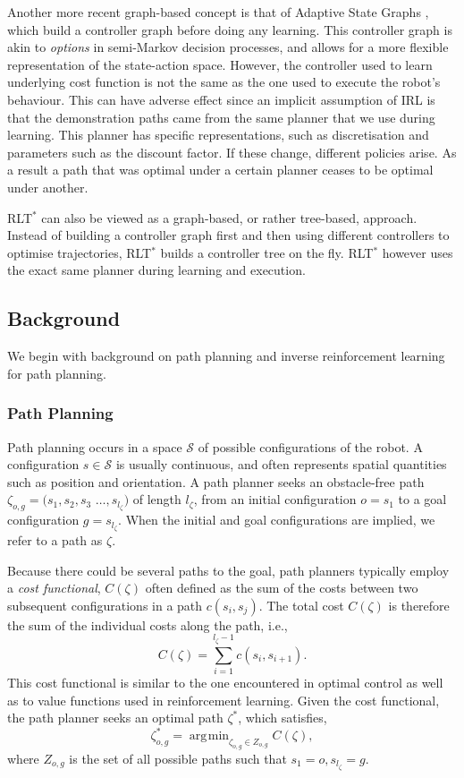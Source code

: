 \documentclass[a4paper,11pt]{report}
\DeclareMathOperator*{\argmin}{\arg\!\min}
\begin{document}
Another more recent graph-based concept is that of Adaptive State Graphs \cite{okallearning}, which build a controller graph before doing any learning. This controller graph is akin to \emph{options} in semi-Markov decision processes, and allows for a more flexible representation of the state-action space. However, the controller used to learn underlying cost function is not the same as the one used to execute the robot's behaviour. This can have adverse effect since an implicit assumption of IRL is that the demonstration paths came from the same planner that we use during learning. This planner has specific representations, such as discretisation and parameters such as the discount factor. If these change, different policies arise. As a result a path that was optimal under a certain planner ceases to be optimal under another.

RLT$^*$ can also be viewed as a graph-based, or rather tree-based, approach. Instead of building a controller graph first and then using different controllers to optimise trajectories, RLT$^*$ builds a controller tree on the fly. RLT$^*$ however uses the exact same planner during learning and execution.


\subsection{Background}
We begin with background on path planning and inverse reinforcement learning for path planning.

\subsubsection{Path Planning \label{subsec:path_planning}}
Path planning occurs in a space $\mathcal{S}$ of possible configurations of the robot. A configuration $s \in \mathcal{S}$ is usually continuous, and often represents spatial quantities such as position and orientation. A path planner seeks an obstacle-free path $\zeta_{o,g} = (s_1,s_2,s_3$ $\ldots,s_{l_{\zeta}}) $ of length $l_{\zeta}$, from an initial configuration $o = s_1$ to a goal configuration  $g =s_{l_{\zeta}}$. When the initial and goal configurations are implied, we refer to a path as $\zeta$.

Because there could be several paths to the goal, path planners typically employ a \emph{cost functional}, $C(\zeta)$ often defined as the sum of the costs between two subsequent configurations in a path $c(s_i,s_j)$. The total cost $C(\zeta)$ is therefore the sum of the individual costs along the path, i.e.,
\begin{equation}
	C(\zeta) = \sum_{i=1}^{l_{\zeta}-1} c(s_i,s_{i+1}).
\end{equation}
This cost functional is similar to the one encountered in optimal control as well as to value functions used in reinforcement learning. Given the cost functional, the path planner seeks an optimal path $\zeta^*$, which satisfies,
\begin{equation}
 	\zeta^*_{o,g} = \argmin_{\zeta_{o,g} \in Z_{o,g}} C(\zeta), \label{eq:back_plan}
\end{equation}
where $Z_{o,g}$ is the set of all possible paths such that $s_1 = o, s_{l_\zeta} = g$.
\end{document}
